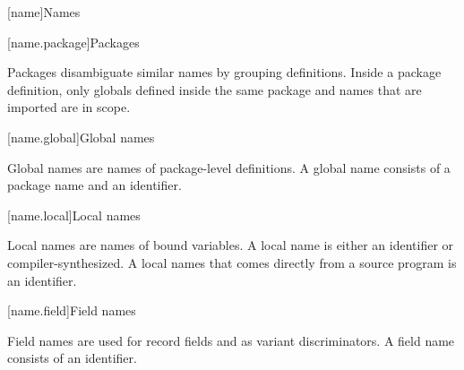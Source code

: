 [name]{Names}

[name.package]{Packages}

Packages disambiguate similar names
by grouping definitions.
Inside a package definition,
only globals defined
inside the same package
and names that are imported
are in scope.

[name.global]{Global names}

Global names
are names
of package-level definitions.
A global name
consists of
a package name
and an identifier.

[name.local]{Local names}

Local names
are names
of bound variables.
A local name
is either an identifier
or compiler-synthesized.
A local names that comes
directly from a source program
is an identifier.

[name.field]{Field names}

Field names
are used
for record fields
and as variant discriminators.
A field name
consists of
an identifier.


